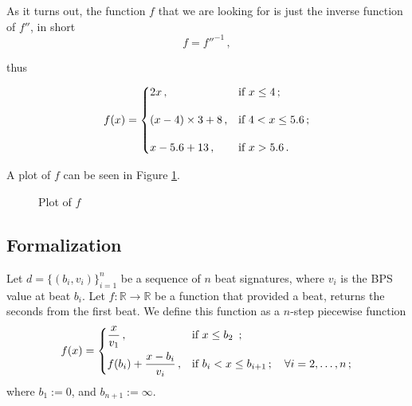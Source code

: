 \documentclass[a4paper,9pt]{article}
\begin{document}
As it turns out, the function $f$ that we are looking for is just the inverse function of $f''$, in short
\begin{equation}
	f = f''^{-1}\,,
	\label{eq:inverse}
\end{equation}

thus

    \begin{equation}
    f(x) = \begin{dcases}
		    2x\,, & \text{if $x \leq 4\,;$}\\[1em]
		    (x-4)\times 3 + 8\,, & \text{if $4 < x \leq 5.6\,;$}\\[1em]  
		    x-5.6 + 13\,, & \text{if $x > 5.6\,.$}\\ 
	    \end{dcases}
	    \label{eq:beat2second}
    \end{equation}
    
    A plot of $f$ can be seen in Figure \ref{fig:second2beat}.
\begin{figure}[htpb]
	\centering

	\caption{Plot of $f$}
	\label{fig:second2beat}
\end{figure}

\subsection{Formalization}
Let $d = \{\left( b_i, v_i \right)\}_{i=1}^{n}$ be a sequence of $n$ beat signatures, where $v_i$ is the BPS  value at beat $b_i$. 
Let $ f: \mathbb{R} \rightarrow \mathbb{R} $ be a function that provided a beat, returns the seconds from the first beat. We define this function as a $n$-step piecewise function
    \begin{equation}
	    f(x) = \begin{dcases}
		    \frac{x}{v_1}\,, & \text{if $x \leq b_{2} $ }\,;\\
		    f(b_{i}) + \frac{x-b_{i}}{v_i}\,, & \text{if $b_{i} < x \leq b_{i+1}\,; \quad \forall i=2,\ldots,n $}\,; \\
	    \end{dcases}
	    \label{eq:beat2second}
    \end{equation}
    where $ b_1 := 0$,  and $b_{n+1} := \infty$.
    
\end{document}
